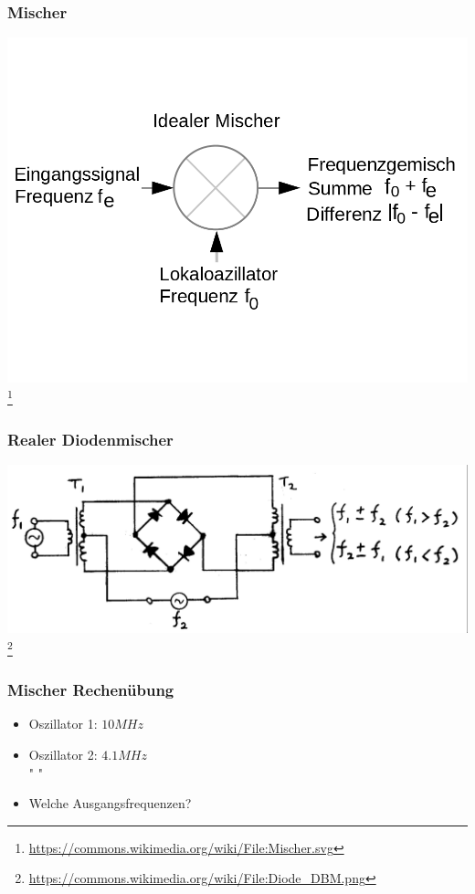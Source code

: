 \begin{frame}
    \frametitle{Mischer}
    \begin{center}
        \includegraphics[width=1\textwidth]{e15/IdealerMischer.png}
        \footnote{\tiny \url{https://commons.wikimedia.org/wiki/File:Mischer.svg}}
	\end{center}
\end{frame}

\begin{frame}
    \frametitle{Realer Diodenmischer}
    \begin{center}
        \includegraphics[width=.9\textwidth]{e15/Realer-Diodenmischer.png}
        \footnote{\tiny \url{https://commons.wikimedia.org/wiki/File:Diode_DBM.png}}
	\end{center}
\end{frame}

\begin{frame}
    \frametitle{Mischer Rechenübung}
    \begin{center}
    \begin{itemize}
			\item Oszillator 1: $10 MHz$
			\item Oszillator 2: $4.1 MHz$ \\ " "
			\item Welche Ausgangsfrequenzen?
    \end{itemize}
	\end{center}
\end{frame}

